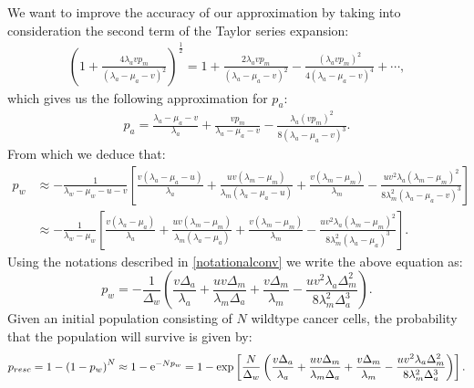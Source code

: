 \documentclass[12pt]{extarticle}
\newcommand{\e}{{\rm e}}
\begin{document}
We want to improve the accuracy of our approximation by taking into consideration the second term of the Taylor series expansion:
\begin{align*}
\left(1+\frac{4\lambda_avp_m}{\left(\lambda_a-\mu_a-v\right)^2}\right)^{\frac{1}{2}}=1+\frac{2\lambda_avp_m}{\left(\lambda_a-\mu_a-v\right)^2}-\frac{\left(\lambda_avp_m\right)^2}{4\left(\lambda_a-\mu_a-v\right)^4}+\cdots,
\end{align*}
which gives us the following approximation for $p_a$:
\begin{align}
p_a=\frac{\lambda_a-\mu_a-v}{\lambda_a}+\frac{vp_m}{\lambda_a-\mu_a-v}-\frac{\lambda_a\left(vp_m\right)^2}{8\left(\lambda_a-\mu_a-v\right)^3}.
\end{align}
From which we deduce that:
\begin{align}\nonumber
p_w&\approx-\frac{1}{\lambda_w-\mu_w-u-v}\left[\frac{v\left(\lambda_a-\mu_a-u\right)}{\lambda_a}+\frac{uv\left(\lambda_m-\mu_m\right)}{\lambda_m\left(\lambda_a-\mu_a-u\right)}+\frac{v\left(\lambda_m-\mu_m\right)}{\lambda_m}-\frac{uv^2\lambda_a\left(\lambda_m-\mu_m\right)^2}{8\lambda_m^2\left(\lambda_a-\mu_a-v\right)^3}\right]\\ \label{survprobw3}
&\approx-\frac{1}{\lambda_w-\mu_w}\left[\frac{v\left(\lambda_a-\mu_a\right)}{\lambda_a}+\frac{uv\left(\lambda_m-\mu_m\right)}{\lambda_m\left(\lambda_a-\mu_a\right)}+\frac{v\left(\lambda_m-\mu_m\right)}{\lambda_m}-\frac{uv^2\lambda_a\left(\lambda_m-\mu_m\right)^2}{8\lambda_m^2\left(\lambda_a-\mu_a\right)^3}\right].
\end{align}
Using the notations described in \eqref{notationalconv} we write the above equation as:
\begin{equation}\label{survprobwapproxcorrected}
p_w=-\frac{1}{\Delta_w}\left(\frac{v\Delta_a}{\lambda_a}+\frac{uv\Delta_m}{\lambda_m\Delta_a}+\frac{v\Delta_m}{\lambda_m}-\frac{uv^2\lambda_a\Delta_m^2}{8\lambda_m^2\Delta_a^3}\right).
\end{equation}
Given an initial population consisting of $N$ wildtype cancer cells, the probability that the population will survive is given by: 
\begin{align}\label{survprobresistantaneuploidy}
p_{resc}=1-\left(1-p_w\right)^N\approx 1-\e^{-Np_w}=1-\exp\left[\frac{N}{\Delta_w}\left(\frac{v\Delta_a}{\lambda_a}+\frac{uv\Delta_m}{\lambda_m\Delta_a}+\frac{v\Delta_m}{\lambda_m}-\frac{uv^2\lambda_a\Delta_m^2}{8\lambda_m^2\Delta_a^3}\right)\right].
\end{align}
\end{document}
